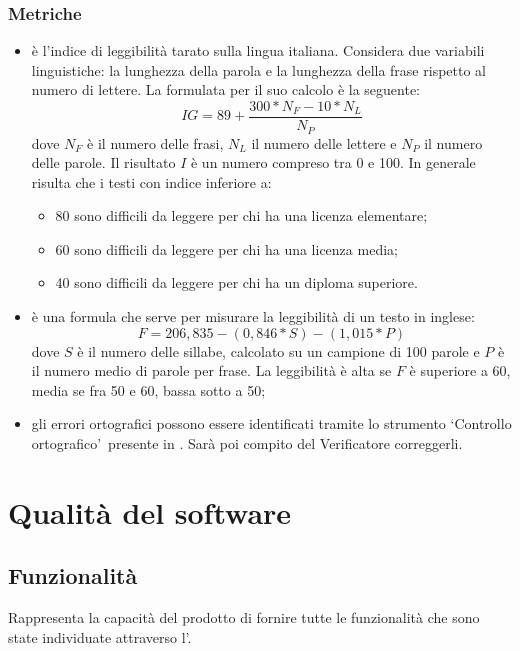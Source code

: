 \documentclass[PianoDiQualifica.tex]{subfiles}
\begin{document}
\subsubsection{Metriche}
\begin{itemize}
	\item {} è l'indice di leggibilità tarato sulla lingua italiana. Considera due variabili linguistiche: la lunghezza della parola e la lunghezza della frase rispetto al numero di lettere. La formulata per il suo calcolo è la seguente:
	\[IG=89+\dfrac{300*N_F-10*N_L}{N_P}\] dove $ N_F $ è il numero delle frasi, $ N_L $ il numero delle lettere e $ N_P $ il numero delle parole. Il risultato $I$ è un numero compreso tra 0 e 100. In generale risulta che i testi con indice inferiore a:
	\begin{itemize}
		\item 80 sono difficili da leggere per chi ha una licenza elementare;
		\item 60 sono difficili da leggere per chi ha una licenza media;
		\item 40 sono difficili da leggere per chi ha un diploma superiore.
	\end{itemize}	
	\item {} è una formula che serve per misurare la leggibilità di un testo in inglese:
	\[F=206,835-(0,846*S)-(1,015*P)\] dove $ S $ è il numero delle sillabe, calcolato su un campione di 100 parole e $ P $ è il numero medio di parole per frase.
	La leggibilità è alta se $F$ è superiore a 60, media se fra 50 e 60, bassa sotto a 50;
	\item {} gli errori ortografici possono essere identificati tramite lo strumento \textquoteleft Controllo ortografico\textquoteright\ presente in . Sarà poi compito del Verificatore correggerli.  	
\end{itemize}
		
\section{Qualità del software}
\subsection{Funzionalità}
Rappresenta la capacità del prodotto di fornire tutte le funzionalità che sono state individuate attraverso l'\adr.	
\end{document}
